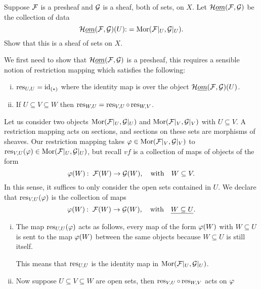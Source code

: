 \documentclass[12pt]{memoir}
\begin{document}

\begin{Ej}
   Suppose $\mathcal{F}$ is a presheaf and $\mathcal{G}$ is a sheaf, both of sets, on $X$. Let $\mathcal{H}\emph{om}(\mathcal{F},\mathcal{G})$ be the collection of data 
   $$\mathcal{H}\emph{om}(\mathcal{F},\mathcal{G})(U)\mathbin{:}=\operatorname{Mor}(\mathcal{F}|_U,\mathcal{G}|_U).$$
   Show that this is a sheaf of sets on $X$. 
\end{Ej}
\begin{ptcbr}
    We first need to show that $\mathcal{H}\emph{om}(\mathcal{F},\mathcal{G})$ is a presheaf, this requires a sensible notion of restriction mapping which satisfies the following:
    \begin{enumerate}[i)]
        \itemsep=-0.4em
        \item $\operatorname*{res}_{U,U}=\operatorname{id}_{(\ast)}$ where the identity map is over the object $\mathcal{H}\emph{om}(\mathcal{F},\mathcal{G})(U)$.
        \item If $U\subseteq V\subseteq W$ then $\operatorname*{res}_{W,U}=\operatorname*{res}_{V,U}\circ\operatorname*{res}_{W,V}$.
    \end{enumerate}
    Let us consider two objects $\operatorname{Mor}(\mathcal{F}|_U,\mathcal{G}|_U)$ and $\operatorname{Mor}(\mathcal{F}|_V,\mathcal{G}|_V)$ with $U\subseteq V$. A restriction mapping acts on sections, and sections on these sets are morphisms of sheaves. Our restriction mapping takes $\varphi\in\operatorname{Mor}(\mathcal{F}|_V,\mathcal{G}|_V)$ to $\operatorname*{res}_{V,U}(\varphi)\in\operatorname{Mor}(\mathcal{F}|_U,\mathcal{G}|_U)$, but recall $vf$ is a collection of maps of objects of the form 
    $$\varphi(W)\mathbin{:}\ \mathcal{F}(W)\to\mathcal{G}(W),\quad\text{with}\quad W\subseteq V.$$
    In this sense, it suffices to only consider the open sets contained in $U$. We declare that $\operatorname*{res}_{V,U}(\varphi)$ is the collection of maps 
    $$\vf(W)\:\ \cF(W)\to\cG(W),\word{with}\un{W\subseteq U}.$$
    \begin{enumerate}[i)]
        \itemsep=-0.4em
        \item The map $\operatorname*{res}_{U,U}(\varphi)$ acts as follows, every map of the form $\varphi(W)$ with $W\subseteq U$ is sent to the map $\varphi(W)$ between the same objects because $W\subseteq U$ is still itself.\par 
        This means that $\operatorname*{res}_{U,U}$ is the identity map in $\operatorname{Mor}(\mathcal{F}|_U,\mathcal{G}|_U)$.
        \item Now suppose $U\subseteq V\subseteq W$ are open sets, then $\operatorname*{res}_{V,U}\circ\operatorname*{res}_{W,V}$ acts on $\varphi$
    \end{enumerate}
\end{ptcbr}
\end{document}

